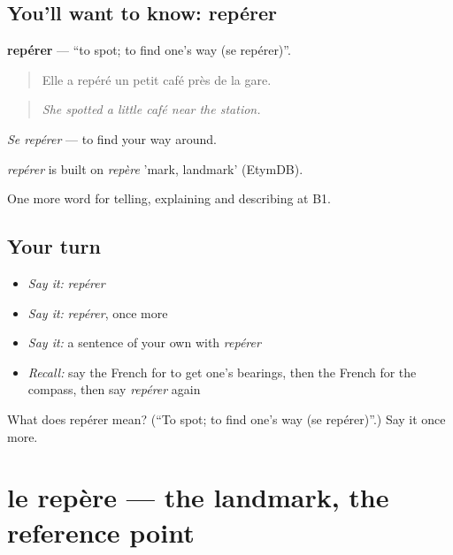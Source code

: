 \subsection*{You'll want to know: repérer}
\textbf{repérer} — \textquotedblleft{}to spot; to find one’s way (se repérer)\textquotedblright{}.

\begin{quote}
Elle a repéré un petit café près de la gare.
\end{quote}

\begin{quote}
\emph{She spotted a little café near the station.}
\end{quote}

\emph{Se repérer} — to find your way around.

\begin{cousinweb}
\emph{repérer} is built on \emph{repère} 'mark, landmark' (EtymDB).
\end{cousinweb}

\begin{grammarlens}[title={What you've built}]
One more word for telling, explaining and describing at B1.
\end{grammarlens}

\subsection*{Your turn}
\begin{itemize}
\raggedright
  \item \emph{Say it:} \emph{repérer}
  \item \emph{Say it:} \emph{repérer}, once more
  \item \emph{Say it:} a sentence of your own with \emph{repérer}
  \item \emph{Recall:} say the French for to get one’s bearings, then the French for the compass, then say \emph{repérer} again
\end{itemize}

\begin{tcolorbox}[breakable,colback=teal!4,colframe=teal!35!black,title={Before you move on}]
What does repérer mean? (\textquotedblleft{}To spot; to find one’s way (se repérer)\textquotedblright{}.) Say it once more.
\end{tcolorbox}
\section[le repère]{le repère — the landmark, the reference point}


